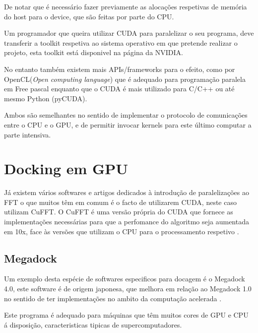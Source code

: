  De notar que é necessário fazer previamente as alocações respetivas de memória do host para o device, que são feitas por parte do CPU.
   
 Um programador que queira utilizar CUDA para paralelizar o seu programa, deve transferir a toolkit respetiva ao sistema operativo em que pretende realizar o projeto, esta toolkit está disponivel na página da NVIDIA.
   
No entanto também existem mais APIs/frameworks para o efeito, como por OpenCL(\textit{Open computing language}) que é adequado para programação paralela em Free pascal enquanto que o CUDA é mais utilizado para C/C++ ou até mesmo Python (pyCUDA). 

Ambos são semelhantes no sentido de implementar o protocolo de comunicações entre o CPU e o GPU, e de permitir invocar kernels para este último computar a parte intensiva.


\section{Docking em GPU}
\label{gpus1}
Já existem vários softwares e artigos dedicados à introdução de paralelizações ao FFT \cite{ritchiew} o que muitos têm em comum é o facto de utilizarem CUDA, neste caso utilizam CuFFT. 
O CuFFT é uma versão própria do CUDA que fornece as implementações necessárias para que a perfomance do algoritmo seja aumentada em 10x, face às versões que utilizam o CPU para o processamento respetivo\cite{nvidiaFFT} . 

\subsection {Megadock}
Um exemplo desta espécie de softwares especificos para docagem é o Megadock 4.0, este software é de origem japonesa, que melhora em relação ao Megadock 1.0 no sentido de ter implementações no ambito da computação acelerada \cite{megadock}.

Este programa é adequado para máquinas que têm muitos cores de GPU e CPU á disposição, caracteristicas tipicas de supercomputadores.

